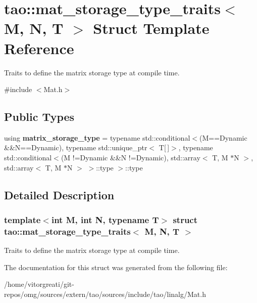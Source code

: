 \hypertarget{structtao_1_1mat__storage__type__traits}{}\section{tao\+::mat\+\_\+storage\+\_\+type\+\_\+traits$<$ M, N, T $>$ Struct Template Reference}
\label{structtao_1_1mat__storage__type__traits}


Traits to define the matrix storage type at compile time.  




{\ttfamily \#include $<$Mat.\+h$>$}

\subsection*{Public Types}
\begin{DoxyCompactItemize}
\item 
\mbox{\label{structtao_1_1mat__storage__type__traits_ab5c165714dd573b8bf764e33ef3629bf}} 
using {\bfseries matrix\+\_\+storage\+\_\+type} = typename std\+::conditional$<$(M==Dynamic \&\&N==Dynamic), typename std\+::unique\+\_\+ptr$<$ T\mbox{[}$\,$\mbox{]}$>$, typename std\+::conditional$<$(M !=Dynamic \&\&N !=Dynamic), std\+::array$<$ T, M $\ast$N $>$, std\+::array$<$ T, M $\ast$N $>$ $>$\+::type $>$\+::type
\end{DoxyCompactItemize}


\subsection{Detailed Description}
\subsubsection*{template$<$int M, int N, typename T$>$\newline
struct tao\+::mat\+\_\+storage\+\_\+type\+\_\+traits$<$ M, N, T $>$}

Traits to define the matrix storage type at compile time. 

The documentation for this struct was generated from the following file\+:\begin{DoxyCompactItemize}
\item 
/home/vitorgreati/git-\/repos/omg/sources/extern/tao/sources/include/tao/linalg/Mat.\+h\end{DoxyCompactItemize}
